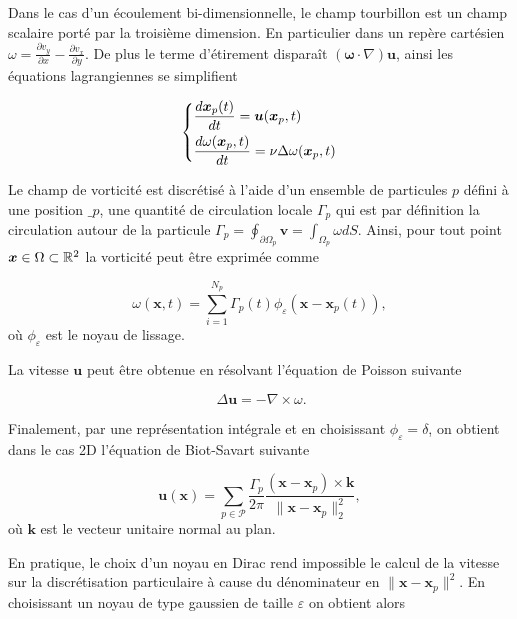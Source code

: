 Dans le cas d'un écoulement bi-dimensionnelle, le champ tourbillon est un champ scalaire porté par la troisième dimension. En particulier dans un repère cartésien $\omega = \frac{\partial v_y}{\partial x} - \frac{\partial v_x}{\partial y}$. De plus le terme d'étirement disparaît $(\bm \omega \cdot \nabla) \bm u$, ainsi les équations lagrangiennes se simplifient

\begin{gather*}
    \left\{\begin{aligned}
         & \frac{d \bm{x}_p(t)}{dt} = \bm u(\bm{x}_p, t)                    \\
         & \frac{d\omega(\bm{x}_p, t)}{dt} = \nu \Delta \omega(\bm{x}_p, t)
    \end{aligned} \right.
\end{gather*}

Le champ de vorticité est discrétisé à l'aide d'un ensemble de particules $p$ défini à une position $\bm _p$, une quantité de circulation locale $\Gamma_p$ qui est par définition la circulation autour de la particule $\Gamma_p = \oint_{\partial \Omega_p} \bm v = \int_{\Omega_p} \omega dS$. Ainsi, pour tout point $\bm{x} \in \Omega \subset \mathbb R^2$ la vorticité peut être exprimée comme

\begin{equation*}
    \omega(\bm x, t) = \sum_{i=1}^{N_p} \Gamma_p(t) \phi_\varepsilon(\bm x - \bm x_p(t)),
\end{equation*}où $\phi_\varepsilon$ est le noyau de lissage.

La vitesse $\bm u$ peut être obtenue en résolvant l'équation de Poisson suivante

\begin{equation*}~\label{eq:poisson}
    \Delta \bm u = - \nabla \times \omega.
\end{equation*}

Finalement, par une représentation intégrale et en choisissant $\phi_\varepsilon = \delta$, on obtient dans le cas 2D l'équation de Biot-Savart suivante

\begin{equation*}
    \bm u(\bm x) = \sum_{p \in \mathcal P} \frac{\Gamma_p}{2\pi} \frac{(\bm x - \bm x_p)\times \bm k}{\|\bm x - \bm x_p\|_2^2},
\end{equation*}où $\bm k$ est le vecteur unitaire normal au plan.

En pratique, le choix d'un noyau en Dirac rend impossible le calcul de la vitesse sur la discrétisation particulaire à cause du dénominateur en ${\|\bm x - \bm x_p\|^2}$. En choisissant un noyau de type gaussien de taille $\varepsilon$ on obtient alors

